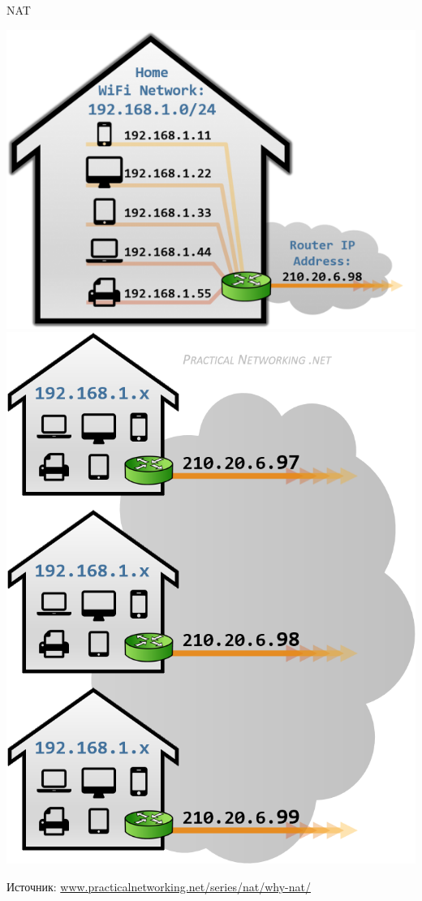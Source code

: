 \begin{frame}[t]{NAT}
	\begin{center}
		\includegraphics[scale=0.3]{nat-home.png}
		\includegraphics[scale=0.3]{nat-homes.png}
	\end{center}
	Источник: \href{https://www.practicalnetworking.net/series/nat/why-nat/}{www.practicalnetworking.net/series/nat/why-nat/}
\end{frame}

